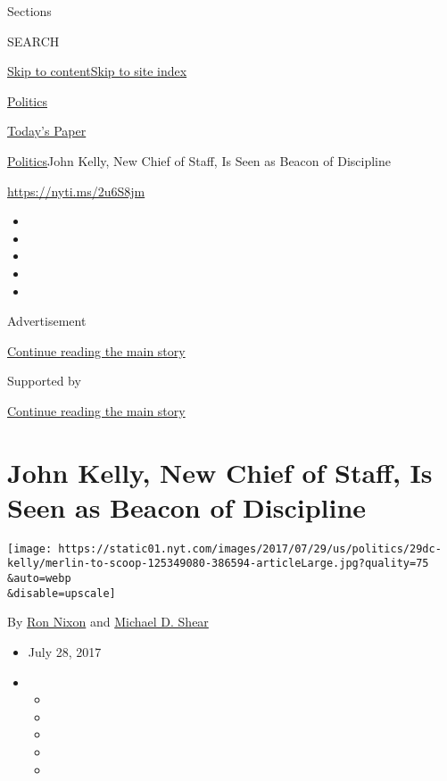 Sections

SEARCH

\protect\hyperlink{site-content}{Skip to
content}\protect\hyperlink{site-index}{Skip to site index}

\href{https://www.nytimes.com/section/politics}{Politics}

\href{https://myaccount.nytimes.com/auth/login?response_type=cookie\&client_id=vi}{}

\href{https://www.nytimes.com/section/todayspaper}{Today's Paper}

\href{/section/politics}{Politics}\textbar{}John Kelly, New Chief of
Staff, Is Seen as Beacon of Discipline

\url{https://nyti.ms/2u6S8jm}

\begin{itemize}
\item
\item
\item
\item
\item
\end{itemize}

Advertisement

\protect\hyperlink{after-top}{Continue reading the main story}

Supported by

\protect\hyperlink{after-sponsor}{Continue reading the main story}

\hypertarget{john-kelly-new-chief-of-staff-is-seen-as-beacon-of-discipline}{%
\section{John Kelly, New Chief of Staff, Is Seen as Beacon of
Discipline}\label{john-kelly-new-chief-of-staff-is-seen-as-beacon-of-discipline}}

\texttt{[image: https://static01.nyt.com/images/2017/07/29/us/politics/29dc-kelly/merlin-to-scoop-125349080-386594-articleLarge.jpg?quality=75\\\&auto=webp\\\&disable=upscale]}

By \href{http://www.nytimes.com/by/ron-nixon}{Ron Nixon} and
\href{http://www.nytimes.com/by/michael-d-shear}{Michael D. Shear}

\begin{itemize}
\item
  July 28, 2017
\item
  \begin{itemize}
  \item
  \item
  \item
  \item
  \item
  \end{itemize}
\end{itemize}

